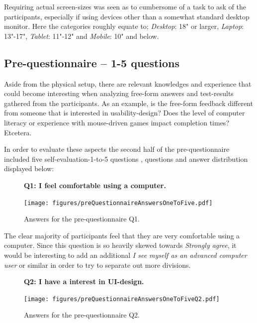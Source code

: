 \documentclass[nofilelist,dvipsnames]{cslthse-msc}
\begin{document}
        Requiring actual screen-sizes was seen as to cumbersome of a task to
        ask of the participants, especially if using devices other than a
        somewhat standard desktop monitor. Here the categories roughly equate
        to; \textit{Desktop}: 18" or larger, \textit{Laptop}: 13"-17", \textit{Tablet}:
        11"-12" and \textit{Mobile}: 10" and below.

			\subsection{Pre-questionnaire -- 1-5 questions}

        Aside from the physical setup, there are relevant knowledges and
        experience that could become interesting when analyzing free-form
        answers and test-results gathered from the participants. As an example,
        is the free-form feedback different from someone that is interested in
        usability-design? Does the level of computer literacy or experience
        with mouse-driven games impact completion times? Etcetera.

        In order to evaluate these aspects the second half of the
        pre-questionnaire included five self-evaluation-1-to-5 questions
        , questions and answer distribution
        displayed below:

				\begin{figure}[h!]
          \textbf{Q1: I feel comfortable using a computer.}
          \begin{center}
            \texttt{[image: figures/preQuestionnaireAnswersOneToFive.pdf]}
            \vspace{-1cm}
            \caption{Answers for the pre-questionnaire Q1.}
          \end{center}
				\end{figure}

        The clear majority of participants feel that they are very comfortable
        using a computer. Since this question is so heavily skewed towards
        \textit{Strongly agree}, it would be interesting to add an additional
        \textit{I see myself as an advanced computer user} or similar in order
        to try to separate out more divisions.

				\begin{figure}[h!]
          \textbf{Q2: I have a interest in UI-design.}
          \begin{center}
            \texttt{[image: figures/preQuestionnaireAnswersOneToFiveQ2.pdf]}
            \vspace{-1cm}
            \caption{Answers for the pre-questionnaire Q2.}
          \end{center}
				\end{figure}
\end{document}
